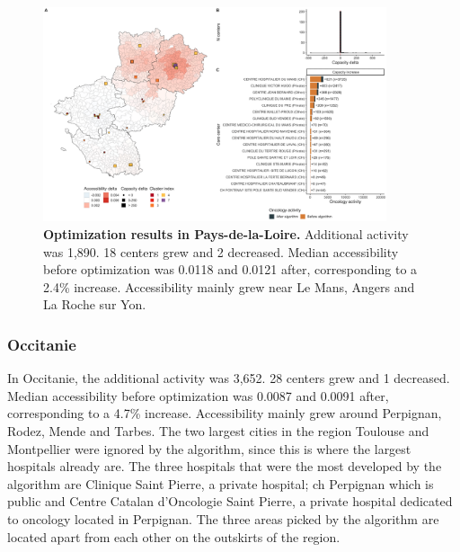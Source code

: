 \begin{figure}[h!]
    \includegraphics[width=0.9\textwidth]{images/camion/optim_region/optim_Pays-de-la-Loire.png}
    \centering
    \caption{ \textbf{Optimization results in Pays-de-la-Loire.} Additional
        activity was 1,890. 18 centers grew and 2 decreased. Median
        accessibility before optimization was 0.0118 and 0.0121 after,
        corresponding to a 2.4\% increase. Accessibility mainly grew near Le
        Mans, Angers and La Roche sur Yon. }
\end{figure}

\subsubsection{Occitanie}

In Occitanie, the additional activity was 3,652. 28 centers grew and 1
decreased. Median accessibility before optimization was 0.0087 and 0.0091 after,
corresponding to a 4.7\% increase. Accessibility mainly grew around Perpignan,
Rodez, Mende and Tarbes. The two largest cities in the region Toulouse and
Montpellier were ignored by the algorithm, since this is where the largest
hospitals already are. The three hospitals that were the most developed by the
algorithm are Clinique Saint Pierre, a private hospital; \ac{ch} Perpignan
which is public and Centre Catalan d'Oncologie Saint Pierre, a private
hospital dedicated to oncology located in Perpignan. The three areas picked
by the algorithm are located apart from each other on the outskirts
of the region.

